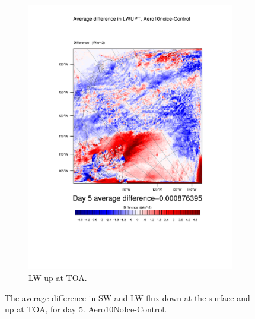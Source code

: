 \begin{figure}
\begin{subfigure}{0.48\textwidth}
		\includegraphics[width=\textwidth]{results/aero10ni/diff_Aero10NoIce_LWUPT_Day5.pdf}
		\caption{LW up at TOA.}
		\label{subfig:lwup_r4Day5}
	\end{subfigure}
	\caption{The average difference in SW and LW flux down at the surface and up at TOA, for day 5. Aero10NoIce-Control.}
	\label{fig:radiation_r4Day5}
\end{figure}

